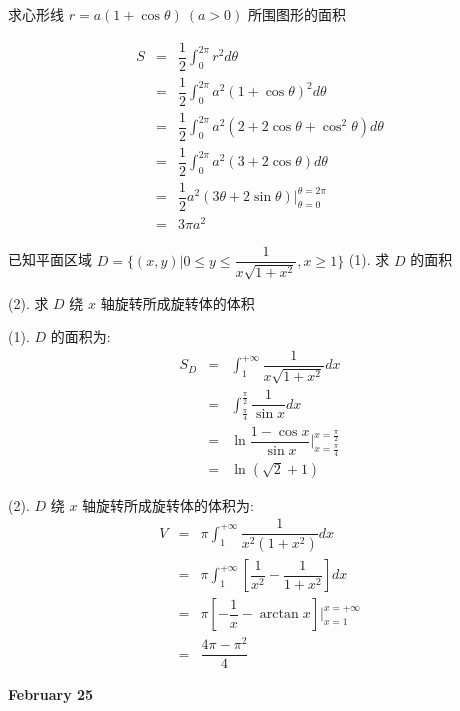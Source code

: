 \begin{example}[][Exam: 28.4.5]
	求心形线 $r=a(1+\cos\theta)\ (a>0)$ 所围图形的面积
\end{example}
\begin{solution}
	\begin{eqnarray*}
		S & = & \dfrac{1}{2}\int_{0}^{2\pi}r^{2}d\theta\\
		  & = & \dfrac{1}{2}\int_{0}^{2\pi}a^{2}(1+\cos\theta)^{2}d\theta\\
		  & = & \dfrac{1}{2}\int_{0}^{2\pi}a^{2}(2+2\cos\theta+\cos^{2}\theta)d\theta\\
		  & = & \dfrac{1}{2}\int_{0}^{2\pi}a^{2}(3+2\cos\theta)d\theta\\
		  & = & \dfrac{1}{2}a^{2}(3\theta+2\sin\theta)\big|_{\theta=0}^{\theta=2\pi}\\
		  & = & 3\pi a^{2}
	\end{eqnarray*}	
\end{solution}
\begin{example}[][Exam: 28.4.6]
	已知平面区域 $D=\{(x,y)|0\leq y\leq \dfrac{1}{x\sqrt{1+x^{2}}},x\geq 1\}$
(1). 求 $D$ 的面积

(2). 求 $D$ 绕 $x$ 轴旋转所成旋转体的体积
\end{example}
\begin{solution}

(1). $D$ 的面积为:
	\begin{eqnarray*}
		S_{D} & = & \int_{1}^{+\infty}\dfrac{1}{x\sqrt{1+x^{2}}}dx\\
			  & = & \int_{\frac{\pi}{4}}^{\frac{\pi}{2}}\dfrac{1}{\sin x}dx\\
			  & = & \ln \dfrac{1-\cos x}{\sin x}\big|_{x=\frac{\pi}{4}}^{x=\frac{\pi}{2}}\\
			  & = & \ln (\sqrt{2} + 1)
	\end{eqnarray*}

(2). $D$ 绕 $x$ 轴旋转所成旋转体的体积为:
	\begin{eqnarray*}
		V & = & \pi\int_{1}^{+\infty}\dfrac{1}{x^{2}(1+x^{2})}dx\\
		  & = & \pi\int_{1}^{+\infty}\left[\dfrac{1}{x^{2}}-\dfrac{1}{1+x^{2}}\right]dx\\
		  & = & \pi\left[-\dfrac{1}{x}-\arctan x\right]\big|_{x=1}^{x=+\infty}\\
		  & = & \dfrac{4\pi-\pi^{2}}{4}
	\end{eqnarray*}
\end{solution}

\textcolor{purplea}{\textbf{February 25}}

